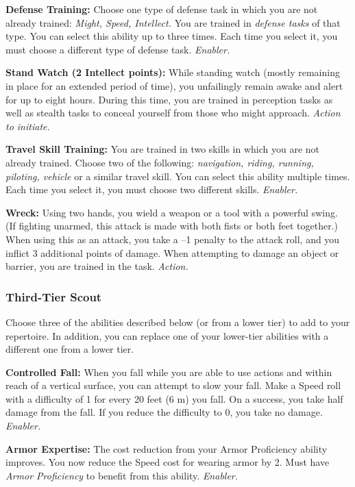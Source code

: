 \documentclass[a4paper,10pt,final,twocolumn,oneside]{book}
\newcommand{\itemAbility}[2]{\textcolor{25gray}{\textbullet\textbf{ #1:}}{ #2}\par}
\newcommand{\enabler}{\textit{ Enabler.}}
\newcommand{\action}{\textit{ Action.}}
\newcommand{\actionInit}{\textit{ Action to initiate.}}
\begin{document}
\itemAbility{Defense Training}{Choose one type of defense task in which you are not already trained: \textit{Might, Speed, Intellect.} You are trained in \emph{defense tasks} of that type. You can select this ability up to three times. Each time you select it, you must choose a different type of defense task.\enabler}

\itemAbility{Stand Watch (2 Intellect points)}{While standing watch (mostly remaining in place for an extended period of time), you unfailingly remain awake and alert for up to eight hours. During this time, you are trained in perception tasks as well as stealth tasks to conceal yourself from those who might approach.\actionInit}

\itemAbility{Travel Skill Training}{You are trained in two skills in which you are not already trained. Choose two of the following: \textit{navigation, riding, running, piloting, vehicle} or a similar travel skill. You can select this ability multiple times. Each time you select it, you must choose two different skills.\enabler}

\itemAbility{Wreck}{Using two hands, you wield a weapon or a tool with a powerful swing. (If fighting unarmed, this attack is made with both fists or both feet together.) When using this as an attack, you take a –1 penalty to the attack roll, and you inflict 3 additional points of damage. When attempting to damage an object or barrier, you are trained in the task. \action}


\subsubsection*{Third-Tier Scout}
\label{subsub:scoutThirdTier}

Choose three of the abilities described
below (or from a lower tier) to add to your
repertoire. In addition, you can replace one
of your lower-tier abilities with a different
one from a lower tier.

\itemAbility{Controlled Fall}{When you fall while you are able to use actions and within reach of a vertical surface, you can attempt to slow your fall. Make a Speed roll with a difficulty of 1 for every 20 feet (6 m) you fall. On a success, you take half damage from the fall. If you reduce the difficulty to 0, you take no damage.\enabler}

\itemAbility{Armor Expertise}{The cost reduction from your Armor Proficiency ability improves. You now reduce the Speed cost for wearing armor by 2. Must have \textit{Armor Proficiency} to benefit from this ability.\enabler}
\end{document}
